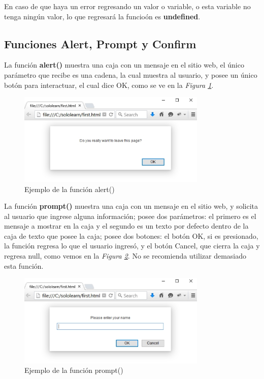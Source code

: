 En caso de que haya un error regresando un valor o variable, o esta variable no tenga ningún valor, lo que regresará la funcioón es \textbf{undefined}.


\subsection{Funciones Alert, Prompt y Confirm}
\hspace{0.55cm}La función \textbf{alert()} muestra una caja con un mensaje en el sitio web, el único parámetro que recibe es una cadena, la cual muestra al usuario, y posee un único botón para interactuar, el cual dice OK, como se ve en la \textit{Figura \ref{fig: 1}}.
\begin{figure}[H]
    \caption{Ejemplo de la función alert()}
    \label{fig: 1}
    \begin{center}
        \includegraphics [width=9cm]{ss/alert.png}
    \end{center}
\end{figure}
La función \textbf{prompt()} muestra una caja con un mensaje en el sitio web, y solicita al usuario que ingrese alguna información; posee dos parámetros: el primero es el mensaje a mostrar en la caja y el segundo es un texto por defecto dentro de la caja de texto que posee la caja; posee dos botones: el botón OK, si es presionado, la función regresa lo que el usuario ingresó, y el botón Cancel, que cierra la caja y regresa null, como vemos en la \textit{Figura \ref{fig: 2}}. No se recomienda utilizar demasiado esta función.
\begin{figure}[H]
    \caption{Ejemplo de la función prompt()}
    \label{fig: 2}
    \begin{center}
        \includegraphics [width=9cm]{ss/prompt.png}
    \end{center}
\end{figure}
